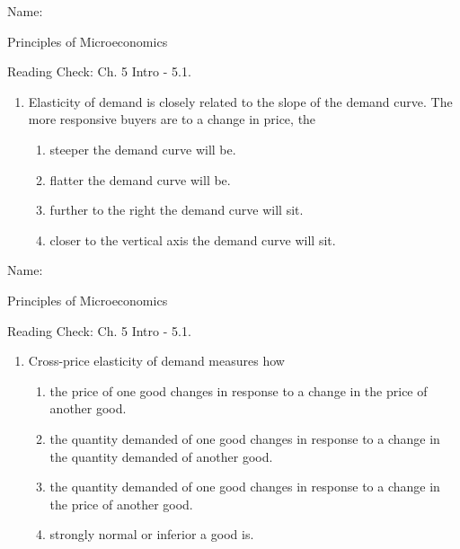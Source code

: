 \documentclass{article}
\begin{document}
\bigskip

Name: \underline{\phantom{xxxxxxxxxxxxxxxxxxxxxxxxxxxxxxxxxxxxxxxx}}

Principles of Microeconomics

Reading Check: Ch. 5 Intro - 5.1.

\begin{enumerate}

\item Elasticity of demand is closely related to the slope of the demand curve. The more responsive buyers are to a change in price, the

	\begin{enumerate}
	
	\item steeper the demand curve will be.
	
	\item flatter the demand curve will be.
	
	\item further to the right the demand curve will sit.
	
	\item closer to the vertical axis the demand curve will sit.
	
	\end{enumerate}
	
\end{enumerate}

\bigskip

Name: \underline{\phantom{xxxxxxxxxxxxxxxxxxxxxxxxxxxxxxxxxxxxxxxx}}

Principles of Microeconomics

Reading Check: Ch. 5 Intro - 5.1.

\begin{enumerate}

\item Cross-price elasticity of demand measures how

	\begin{enumerate}
	
	\item the price of one good changes in response to a change in the price of another good.
	
	\item the quantity demanded of one good changes in response to a change in the quantity demanded of another good.
	
	\item the quantity demanded of one good changes in response to a change in the price of another good.
	
	\item strongly normal or inferior a good is.
	
	\end{enumerate}
	
\end{enumerate}
\end{document}
